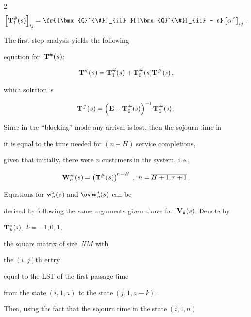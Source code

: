 \begin{multicols}{2}
\begin{gather*}
\left[ \bmx{T}^{\#}_1(s) \right]_{ij}


= \fr{[\bmx{Q}^{\#}]_{ii} }{[\bmx{Q}^{\#}]_{ii} - s}


\left[\alpha^{\#}\right]_{ij}  \,.


\end{gather*}





\noindent The first-step analysis yields the following 


equation for~$\mathbf{T}^{\#}(s)$:


$$


\bmx{T}^{\#}(s)= \bmx{T}^{\#}_1(s) + \bmx{T}^{\#}_0(s) \bmx{T}^{\#}(s)\,,


$$


which solution is


$$


\bmx{T}^{\#}(s)= \left(\bmx{E}-\bmx{T}^{\#}_0(s)\right)^{-1} \bmx{T}^{\#}_1(s)\,.


$$








Since in the ``blocking'' mode any arrival is lost, then the sojourn time in 


it is equal to the time needed for $(n-H)$ service completions,


given that initially, there were $n$ customers in the system, i.\,e.,


$$


\bmx{W}^{\#}_n(s)= \left(\bmx{T}^{\#}(s)\right)^{n-H}\,, \enskip


n=\overline{H+1,r+1}\,.


$$





Equations for $\mathbf{w}^*_n(s)$ and $\bmx{\ov w}^*_n(s)$ can be 


derived by following the same arguments given above for~$\mathbf{V}_n(s)$. Denote by 


$\mathbf{T}^{*}_k(s)$, $k=-1,0,1$,  


the square matrix of size~$NM$ with 


the $(i,j)${th} entry 


equal to the LST of the first passage time 


from the state $(i,1,n)$ to the state $(j,1,n-k)$.


Then, using the fact that the sojourn time in the state $(i,1,n)$



\end{multicols}
